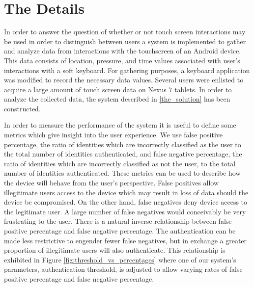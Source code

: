 \section{The Details}
\label{the_details}

In order to answer the question of
whether or not touch screen interactions may be used
in order to distinguish between users
a system is implemented to gather and analyze data
from interactions with the touchscreen of an Android device.
This data consists of location, pressure, and time
values associated with user's interactions with a soft keyboard.
%
For gathering purposes,
a keyboard application was modified to record
the necessary data values.
%
Several users were enlisted to acquire
a large amount of touch screen data on Nexus $7$ tablets.
%
In order to analyze the collected data,
the system described in \ref{the_solution}
has been constructed.

In order to measure the performance of the system
it is useful to define some metrics
which give insight into the user experience.
%
We use false positive percentage,
the ratio of identities which are incorrectly classified as the user
to the total number of identities authenticated,
and
false negative percentage,
the ratio of identities which are incorrectly classified as not the user,
to the total number of identities authenticated.
%
These metrics can be used to describe how the device will
behave from the user's perspective.
%
False positives allow illegitimate users access to the device
which may result in loss of data should the device be compromised.
%
On the other hand,
false negatives deny device access to the legitimate user.
A large number of false negatives would conceivably 
be very frustrating to the user.
%
There is a natural inverse relationship between
false positive percentage and false negative percentage.
The authentication can be made less restrictive to 
engender fewer false negatives, but
in exchange a greater proportion of
illegitimate users will also authenticate.
%
This relationship is exhibited in Figure \ref{fig:threshold_vs_percentages}
where one of our system's parameters, authentication threshold, 
is adjusted to allow varying rates 
of false positive percentage and false negative percentage.

